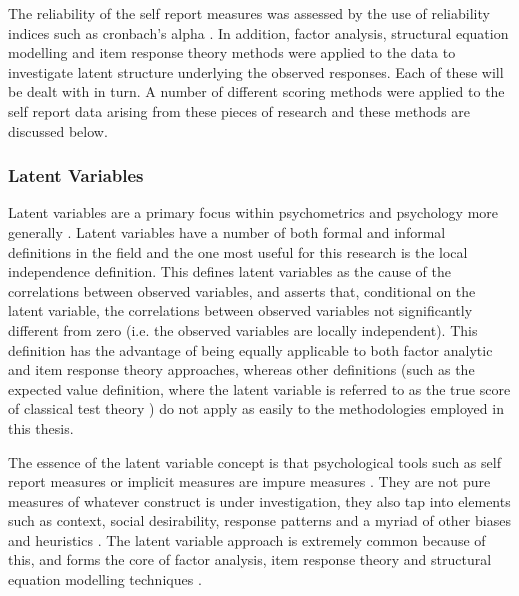The reliability of the self report measures was assessed by the use of reliability indices such as cronbach's alpha \cite{cronbach1951coefficient}. In addition, factor analysis, structural equation modelling and item response theory methods were applied to the data to investigate latent structure underlying the observed responses. Each of these will be dealt with in turn.  A number of different scoring methods were applied to the self report data arising from these pieces of research and these methods  are discussed below.


\subsubsection{Latent Variables}

Latent variables are a primary focus within psychometrics and psychology more generally \cite{bollen2002latent} \cite{borsboom2006attack}. 
Latent variables have a number of both formal and informal definitions in the field \cite{bollen2002latent} and the one most useful for this research is the local independence definition. This defines latent variables as the cause of the correlations between observed variables, and asserts that, conditional on the latent variable, the correlations between observed variables not significantly different from zero (i.e. the observed variables are locally independent). This definition has the advantage of being equally applicable to both factor analytic and item response theory approaches, whereas other definitions (such as the expected value definition, where the latent variable is referred to as the true score of classical test theory \cite{bollen2002latent}) do not apply as easily to the methodologies employed in this thesis. 


The essence of the latent variable concept is that psychological tools such as self report measures or implicit measures are impure measures \cite{edwards2000nature}. They are not pure measures of whatever construct is under investigation, they also tap into elements such as context, social desirability, response patterns and a myriad of other biases and heuristics \cite{borsboom2006attack}. The latent variable approach is extremely common because of this, and forms the core of factor analysis, item response theory and structural equation modelling techniques \cite{bollen2002latent}. 

